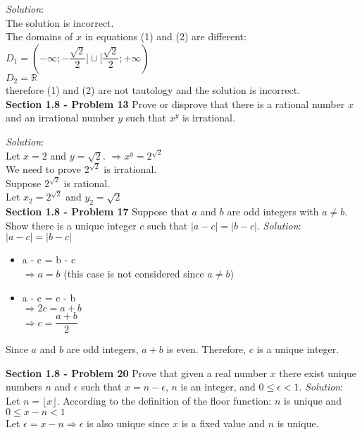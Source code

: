 \documentclass[10pt]{article}
\begin{document}
\bigbreak
\textit{Solution}: \\
    The solution is incorrect. \\
    The domains of $x$ in equations (1) and (2) are different: \\
    $D_{1} = (-\infty; -\dfrac{\sqrt{2}}{2}] \cup [\dfrac{\sqrt{2}}{2}; +\infty)$ \\
    $D_{2} = \mathbb{R}$ \\
    therefore (1) and (2) are not tautology and the solution is incorrect. \\

\clearpage
\textbf{Section 1.8 - Problem 13} Prove or disprove that there is a rational number
$x$ and an irrational number $y$ such that $x^{y}$ is irrational.

\bigbreak
\textit{Solution}: \\
    Let $x = 2$ and $y = \sqrt{2}$.
    $\Rightarrow x^{y} = 2^{\sqrt{2}}$ \\
    We need to prove $2^{\sqrt{2}}$ is irrational. \\

    Suppose $2^{\sqrt{2}}$ is rational. \\
    Let $x_{2} = 2^{\sqrt{2}}$ and $y_{2} = \sqrt{2}$ \\

\clearpage
\textbf{Section 1.8 - Problem 17} Suppose that $a$ and $b$ are odd integers with
$a \neq b$. Show there is a unique integer $c$ such that $|a - c| = |b - c|$.
\bigbreak
\textit{Solution}: \\
    $|a - c| = |b - c|$
    \begin{itemize}
        \item a - c = b - c \\
            $\Rightarrow a = b$ (this case is not considered since $a \neq b$) \\
        \item a - c = c - b \\
            $\Rightarrow 2c = a + b$ \\
            $\Rightarrow c = \dfrac{a + b}{2}$
    \end{itemize}
    Since $a$ and $b$ are odd integers, $a + b$ is even. Therefore, $c$ is a unique integer.

\clearpage
\textbf{Section 1.8 - Problem 20} Prove that given a real number $x$ there exist unique numbers
$n$ and $\epsilon$ such that $x = n - \epsilon$, $n$ is an integer, and $0 \leq \epsilon < 1$.
\bigbreak
\textit{Solution}: \\
    Let $n = \lfloor x \rfloor$. According to the definition of the floor function:
    $n$ is unique and $0 \leq x - n < 1$ \\
    Let $\epsilon = x - n \Rightarrow \epsilon$ is also unique since $x$ is a fixed value and
    $n$ is unique.
\end{document}
